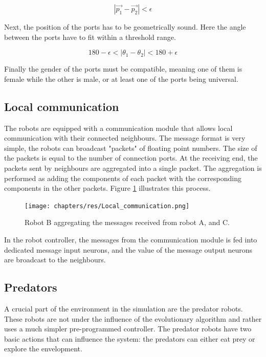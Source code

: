 \begin{equation}
	|\vec{p_1} - \vec{p_2}| < \epsilon
\end{equation}
		
Next, the position of the ports has to be geometrically sound.
Here the angle between the ports have to fit within a threshold range.
		
\begin{equation}
	180 - \epsilon < |\theta_1 - \theta_2| < 180 + \epsilon
\end{equation}
		
Finally the gender of the ports must be compatible, meaning one of them is female while the other is male, or at least one of the ports being universal.
		
\subsection{Local communication}
\label{sec:local_comm}
The robots are equipped with a communication module that allows local communication with their connected neighbours.
The message format is very simple, the robots can broadcast "packets" of floating point numbers.
The size of the packets is equal to the number of connection ports.
At the receiving end, the packets sent by neighbours are aggregated into a single packet.
The aggregation is performed as adding the components of each packet with the corresponding components in the other packets. Figure \ref{fig:local_communication} illustrates this process.
	
\begin{figure}[H]
	\centering
	\texttt{[image: chapters/res/Local\_communication.png]}
	\caption{Robot B aggregating the messages received from robot A, and C.}
	\label{fig:local_communication}
\end{figure}
	
In the robot controller, the messages from the communication module is fed into dedicated message input neurons, and the value of the message output neurons are broadcast to the neighbours.

		
\subsection{Predators}
A crucial part of the environment in the simulation are the predator robots.
These robots are not under the influence of the evolutionary algorithm and rather uses a much simpler pre-programmed controller.
The predator robots have two basic actions that can influence the system: the predators can either eat prey or explore the envelopment.

